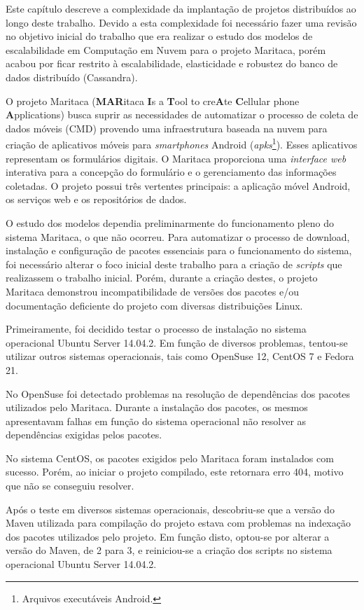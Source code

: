 Este capítulo descreve a complexidade da implantação de projetos distribuídos ao longo deste trabalho. Devido a esta complexidade foi necessário fazer uma revisão no objetivo inicial do trabalho que era realizar o estudo dos modelos de escalabilidade em Computação em Nuvem para o projeto Maritaca, porém acabou por ficar restrito à escalabilidade, elasticidade e robustez do banco de dados distribuído (Cassandra).


O projeto Maritaca (\textbf{MAR}itaca \textbf{I}s a \textbf{T}ool to cre\textbf{A}te \textbf{C}ellular phone \textbf{A}pplications) busca suprir as necessidades de automatizar o processo de coleta de dados móveis (CMD) provendo uma infraestrutura baseada na nuvem para criação de aplicativos móveis para \textit{smartphones} Android (\textit{apks}\footnote{Arquivos executáveis Android.}). Esses aplicativos representam os formulários digitais. O Maritaca proporciona uma \textit{interface web} interativa para a concepção do formulário e o gerenciamento das informações coletadas. O projeto possui três vertentes principais: a aplicação móvel Android, os serviços web e os repositórios de dados. 


O estudo dos modelos dependia preliminarmente do funcionamento pleno do sistema Maritaca, o que não ocorreu. Para automatizar o processo de download, instalação e configuração de pacotes essenciais para o funcionamento do sistema, foi necessário alterar o foco inicial deste trabalho para a criação de \textit{scripts} que realizassem o trabalho inicial. Porém, durante a criação destes, o projeto Maritaca demonstrou incompatibilidade de versões dos pacotes e/ou documentação deficiente do projeto com diversas distribuições Linux.

Primeiramente, foi decidido testar o processo de instalação no sistema operacional Ubuntu Server 14.04.2. Em função de diversos problemas, tentou-se utilizar outros sistemas operacionais, tais como OpenSuse 12, CentOS 7 e Fedora 21.

No OpenSuse foi detectado problemas na resolução de dependências dos pacotes utilizados pelo Maritaca. Durante a instalação dos pacotes, os mesmos apresentavam falhas em função do sistema operacional não resolver as dependências exigidas pelos pacotes.

No sistema CentOS, os pacotes exigidos pelo Maritaca foram instalados com sucesso. Porém, ao iniciar o projeto compilado, este retornara erro 404, motivo que não se conseguiu resolver.

Após o teste em diversos sistemas operacionais, descobriu-se que a versão do Maven utilizada para compilação do projeto estava com problemas na indexação dos pacotes utilizados pelo projeto. Em função disto, optou-se por alterar a versão do Maven, de 2 para 3, e reiniciou-se a criação dos scripts no sistema operacional Ubuntu Server 14.04.2.

